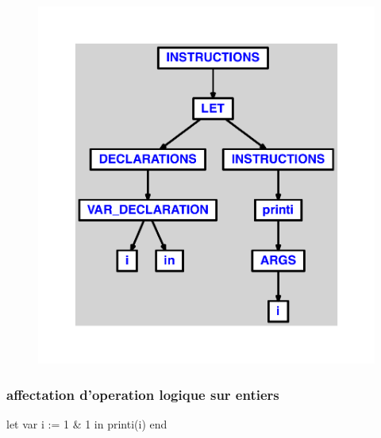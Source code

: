 \documentclass{article}
\begin{document}
\begin{figure}[H]\centering\includegraphics[max width=\textwidth]{ast/ast_289.pdf}\end{figure}\subsubsection{affectation d'operation logique sur entiers}
\begin{verbatimtab}
let
	var i := 1 & 1
in
	printi(i)
end
\end{verbatimtab}
\end{document}

